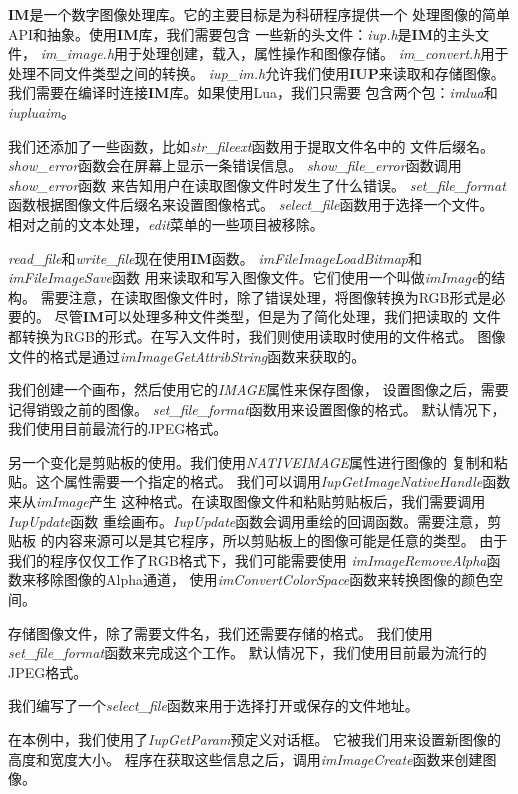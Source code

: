 \documentclass{ctexart}
\begin{document}
\textbf{IM}是一个数字图像处理库。它的主要目标是为科研程序提供一个
处理图像的简单API和抽象。使用\textbf{IM}库，我们需要包含
一些新的头文件：\emph{iup.h}是\textbf{IM}的主头文件，
\emph{im\_image.h}用于处理创建，载入，属性操作和图像存储。
\emph{im\_convert.h}用于处理不同文件类型之间的转换。
\emph{iup\_im.h}允许我们使用\textbf{IUP}来读取和存储图像。
我们需要在编译时连接\textbf{IM}库。如果使用Lua，我们只需要
包含两个包：\emph{imlua}和\emph{iupluaim}。

我们还添加了一些函数，比如\emph{str\_fileext}函数用于提取文件名中的
文件后缀名。\emph{show\_error}函数会在屏幕上显示一条错误信息。
\emph{show\_file\_error}函数调用\emph{show\_error}函数
来告知用户在读取图像文件时发生了什么错误。
\emph{set\_file\_format}函数根据图像文件后缀名来设置图像格式。
\emph{select\_file}函数用于选择一个文件。
相对之前的文本处理，\emph{edit}菜单的一些项目被移除。

\emph{read\_file}和\emph{write\_file}现在使用\textbf{IM}函数。
\emph{imFileImageLoadBitmap}和\emph{imFileImageSave}函数
用来读取和写入图像文件。它们使用一个叫做\emph{imImage}的结构。
需要注意，在读取图像文件时，除了错误处理，将图像转换为RGB形式是必要的。
尽管\textbf{IM}可以处理多种文件类型，但是为了简化处理，我们把读取的
文件都转换为RGB的形式。在写入文件时，我们则使用读取时使用的文件格式。
图像文件的格式是通过\emph{imImageGetAttribString}函数来获取的。

我们创建一个画布，然后使用它的\emph{IMAGE}属性来保存图像，
设置图像之后，需要记得销毁之前的图像。
\emph{set\_file\_format}函数用来设置图像的格式。
默认情况下，我们使用目前最流行的JPEG格式。

另一个变化是剪贴板的使用。我们使用\emph{NATIVEIMAGE}属性进行图像的
复制和粘贴。这个属性需要一个指定的格式。
我们可以调用\emph{IupGetImageNativeHandle}函数来从\emph{imImage}产生
这种格式。在读取图像文件和粘贴剪贴板后，我们需要调用\emph{IupUpdate}函数
重绘画布。\emph{IupUpdate}函数会调用重绘的回调函数。需要注意，剪贴板
的内容来源可以是其它程序，所以剪贴板上的图像可能是任意的类型。
由于我们的程序仅仅工作了RGB格式下，我们可能需要使用
\emph{imImageRemoveAlpha}函数来移除图像的Alpha通道，
使用\emph{imConvertColorSpace}函数来转换图像的颜色空间。

存储图像文件，除了需要文件名，我们还需要存储的格式。
我们使用\emph{set\_file\_format}函数来完成这个工作。
默认情况下，我们使用目前最为流行的JPEG格式。

我们编写了一个\emph{select\_file}函数来用于选择打开或保存的文件地址。

在本例中，我们使用了\emph{IupGetParam}预定义对话框。
它被我们用来设置新图像的高度和宽度大小。
程序在获取这些信息之后，调用\emph{imImageCreate}函数来创建图像。
\end{document}

